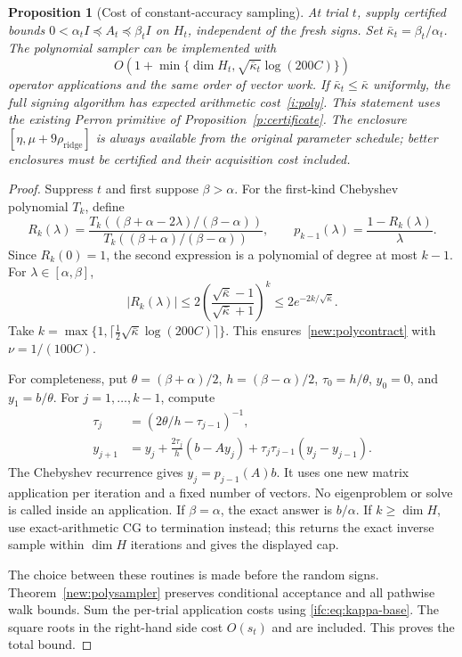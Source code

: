 \documentclass[11pt]{amsart}
\newtheorem{proposition}[theorem]{Proposition}
\theoremstyle{definition}\newtheorem{definition}[theorem]{Definition}
\theoremstyle{remark}\newtheorem{remark}[theorem]{Remark}
\numberwithin{equation}{section}
\begin{document}
\begin{proposition}[Cost of constant-accuracy sampling]\label{new:polycost}
At trial $t$, supply certified bounds
$0<\alpha_t I\preceq A_t\preceq\beta_t I$ on $H_t$, independent of the
fresh signs. Set $\bar\kappa_t=\beta_t/\alpha_t$. The polynomial sampler
can be implemented with
\[
 O\!\left(1+\min\{\dim H_t,\sqrt{\bar\kappa_t}\log(200C)\}\right)
\]
operator applications and the same order of vector work. If
$\bar\kappa_t\le\bar\kappa$ uniformly, the full signing algorithm has
expected arithmetic cost~\eqref{i:poly}. This statement uses the existing
Perron primitive of Proposition~\ref{p:certificate}.
The enclosure $[\eta,\mu+9\rho_{\mathrm{ridge}}]$ is always available
from the original parameter schedule; better enclosures must be certified
and their acquisition cost included.
\end{proposition}
\begin{proof}
Suppress $t$ and first suppose $\beta>\alpha$. For the first-kind
Chebyshev polynomial $T_k$, define
\[
 R_k(\lambda)=
 \frac{T_k((\beta+\alpha-2\lambda)/(\beta-\alpha))}
      {T_k((\beta+\alpha)/(\beta-\alpha))},\qquad
 p_{k-1}(\lambda)=\frac{1-R_k(\lambda)}{\lambda}.
\]
Since $R_k(0)=1$, the second expression is a polynomial of degree at
most $k-1$. For $\lambda\in[\alpha,\beta]$,
\[
 |R_k(\lambda)|\le
 2\left(\frac{\sqrt{\bar\kappa}-1}{\sqrt{\bar\kappa}+1}\right)^k
 \le2e^{-2k/\sqrt{\bar\kappa}}.
\]
Take $k=\max\{1,\lceil\tfrac12\sqrt{\bar\kappa}\log(200C)\rceil\}$.
This ensures~\eqref{new:polycontract} with $\nu=1/(100C)$.

For completeness, put $\theta=(\beta+\alpha)/2$,
$h=(\beta-\alpha)/2$, $\tau_0=h/\theta$, $y_0=0$, and $y_1=b/\theta$.
For $j=1,\ldots,k-1$, compute
\begin{align*}
 \tau_j&=(2\theta/h-\tau_{j-1})^{-1},\\
 y_{j+1}&=y_j+\frac{2\tau_j}{h}(b-Ay_j)
                 +\tau_j\tau_{j-1}(y_j-y_{j-1}).
\end{align*}
The Chebyshev recurrence gives $y_j=p_{j-1}(A)b$. It uses one new
matrix application per iteration and a fixed number of vectors. No
eigenproblem or solve is called inside an application. If $\beta=\alpha$,
the exact answer is $b/\alpha$. If $k\ge\dim H$, use exact-arithmetic
CG to termination instead; this returns the exact inverse sample within
$\dim H$ iterations and gives the displayed cap.

The choice between these routines is made before the random signs.
Theorem~\ref{new:polysampler} preserves conditional acceptance and all
pathwise walk bounds. Sum the per-trial application costs using
\eqref{ifc:eq:kappa-base}. The square roots in the right-hand side cost
$O(s_t)$ and are included. This proves the total bound.
\end{proof}
\end{document}
